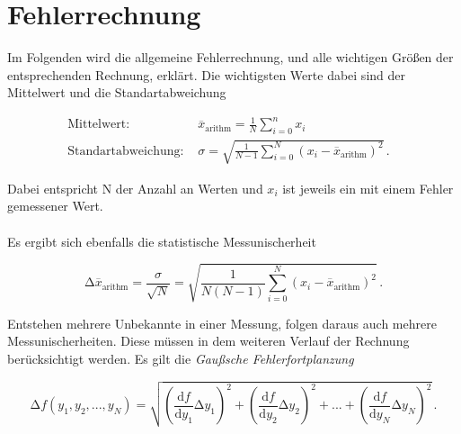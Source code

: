\section{Fehlerrechnung}
\label{sec:Fehlerrechnung}

Im Folgenden wird die allgemeine Fehlerrechnung, und alle wichtigen Größen der entsprechenden Rechnung, erklärt.
Die wichtigsten Werte dabei sind der Mittelwert und die Standartabweichung

\begin{align}
    \text{Mittelwert:} & \stackrel{_{-}}{x}_{\text{arithm}}  = \frac{1}{N} \sum_{i=0}^{n} x_i & \\
    \text{Standartabweichung: } & \sigma  = \sqrt{\frac{1}{N - 1 } \sum_{i=0}^{N} (x_i -  \stackrel{_{-}}{x}_{\text{arithm}})^2} \, .
\end{align}

Dabei entspricht N der Anzahl an Werten und $x_i$ ist jeweils ein mit einem Fehler gemessener Wert.\\
\\
Es ergibt sich ebenfalls die statistische Messunischerheit

\begin{equation}
    \increment \stackrel{_{-}}{x}_{\text{arithm}} = \frac{\sigma}{\sqrt{N}} = 
    \sqrt{\frac{1}{N(N - 1)} \sum_{i=0}^{N} (x_i -  \stackrel{_{-}}{x}_{\text{arithm}})^2} \, .
\end{equation} 

Entstehen mehrere Unbekannte in einer Messung, folgen daraus auch mehrere Messunischerheiten.
Diese müssen in dem weiteren Verlauf der Rechnung berücksichtigt werden.
Es gilt die \textit{Gaußsche Fehlerfortplanzung}

\begin{equation}
    \increment f(y_1 ,y_2 ,...,y_N ) = \sqrt{\left(\frac{\text{d} f}{\text{d} y_{1}} \increment y_{1}\right)^2
    + \left(\frac{\text{d} f}{\text{d} y_{2}} \increment y_{2}\right)^2 + ... + 
    \left(\frac{\text{d} f}{\text{d} y_{N}} \increment y_{N}\right)^2
    } \, .
\end{equation}